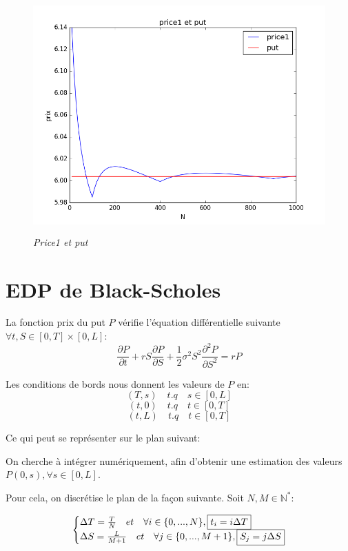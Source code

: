 \documentclass[10pt]{article}
\makeatletter
\newenvironment{sistema}%
{\left\lbrace\begin{array}{@{}l@{}}}%
  {\end{array}\right.}
\makeatother
\begin{document}
  \begin{figure}[H]
    \begin{center}
      \includegraphics[height=9cm,keepaspectratio]{./images/Q19.png}
    \end{center}
    \caption{\textit{Price1 et put}}
    \label{Q19}
  \end{figure}
  
  \newpage
  \section{EDP de Black-Scholes}
  La fonction prix du put $P$ vérifie l'équation différentielle suivante $\forall t, S \in [0, T] \times [0, L]$:
  $$\frac{\partial P}{\partial t} + rS\frac{\partial P}{\partial S} + \frac{1}{2} \sigma^2 S^2 \frac{\partial^2 P}{\partial S^2} = rP$$
  
  Les conditions de bords nous donnent les valeurs de $P$ en:
  $$(T, s) \quad t.q \quad s \in [0, L]$$
  $$(t, 0) \quad t.q \quad t \in [0, T]$$
  $$(t, L) \quad t.q \quad t \in [0, T]$$
  
  Ce qui peut se représenter sur le plan suivant:
  
  On cherche à intégrer numériquement, afin d'obtenir une estimation des valeurs $P(0, s), \forall s \in [0, L]$.
  
  Pour cela, on discrétise le plan de la façon suivante. Soit $N, M \in \mathbb{N}^*$:
  
  $$
  \begin{sistema}
    \Delta T = \frac{T}{N} \quad et \quad \forall i \in \{0, ..., N\}, \boxed{t_i = i \Delta T}\\
    \Delta S = \frac{L}{M + 1} \quad et \quad \forall j \in \{0, ..., M + 1\}, \boxed{S_j = j \Delta S}
  \end{sistema}
  $$
  
\end{document}
